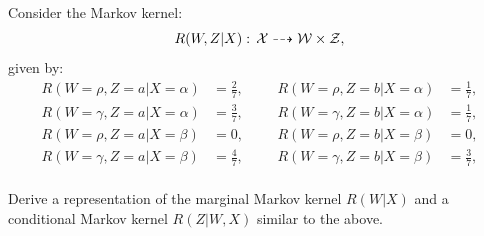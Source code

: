 Consider the Markov kernel:
\[ R(W,Z|X):\, \mathcal{X} \dashrightarrow \mathcal{W} \times \mathcal{Z},\]
given by:
\begin{align*}
   R(W=\rho,Z=a|X=\alpha) &= \frac{2}{7}, &&& R(W=\rho,Z=b|X=\alpha) &= \frac{1}{7}, \\
   R(W=\gamma,Z=a|X=\alpha) &= \frac{3}{7}, &&& R(W=\gamma,Z=b|X=\alpha) &= \frac{1}{7}, \\
   R(W=\rho,Z=a|X=\beta) &= 0, &&& R(W=\rho,Z=b|X=\beta) &= 0, \\
   R(W=\gamma,Z=a|X=\beta) &= \frac{4}{7}, &&& R(W=\gamma,Z=b|X=\beta) &= \frac{3}{7}, \\
\end{align*}

Derive a representation of the marginal Markov kernel $R(W|X)$ and a conditional Markov kernel $R(Z|W,X)$ similar to the above.

